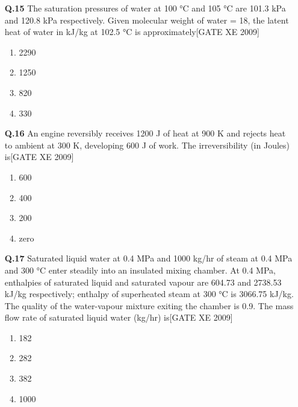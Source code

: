 \documentclass[journal,12pt,onecolumn]{IEEEtran}
\theoremstyle{remark}
\begin{document}
\begin{enumerate}
\vspace{0.3cm}

\item[\textbf{Q.15}] The saturation pressures of water at 100 °C and 105 °C are 101.3 kPa and 120.8 kPa respectively. Given molecular weight of water = 18, the latent heat of water in kJ/kg at 102.5 °C is approximately\hfill[GATE XE 2009]
\begin{multicols}{2}
\begin{enumerate}
    \item 2290
    \item 1250
    \item 820
    \item 330
\end{enumerate}
\end{multicols}

\vspace{0.3cm}

\item[\textbf{Q.16}] An engine reversibly receives 1200 J of heat at 900 K and rejects heat to ambient at 300 K, developing 600 J of work. The irreversibility (in Joules) is\hfill[GATE XE 2009]
\begin{multicols}{2}
\begin{enumerate}
    \item 600
    \item 400
    \item 200
    \item zero
\end{enumerate}
\end{multicols}

\vspace{0.3cm}

\item[\textbf{Q.17}] Saturated liquid water at 0.4 MPa and 1000 kg/hr of steam at 0.4 MPa and 300 °C enter steadily into an insulated mixing chamber. At 0.4 MPa, enthalpies of saturated liquid and saturated vapour are 604.73 and 2738.53 kJ/kg respectively; enthalpy of superheated steam at 300 °C is 3066.75 kJ/kg. The quality of the water-vapour mixture exiting the chamber is 0.9. The mass flow rate of saturated liquid water (kg/hr) is\hfill[GATE XE 2009]
\begin{multicols}{2}
\begin{enumerate}
    \item 182
    \item 282
    \item 382
    \item 1000
\end{enumerate}
\end{multicols}


\end{enumerate}
\end{document}
